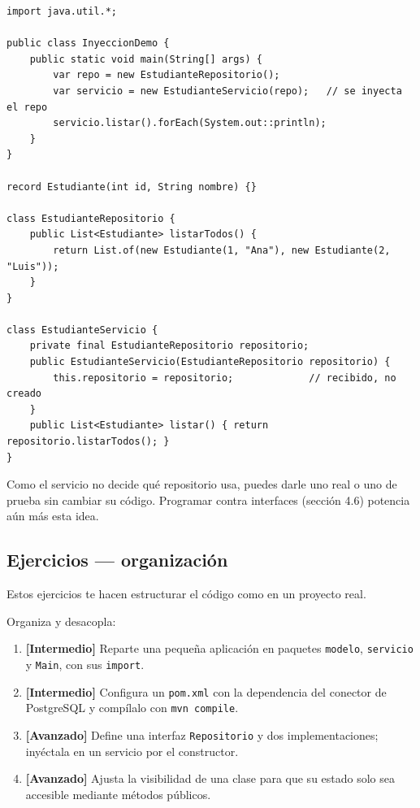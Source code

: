 \documentclass[11pt]{article}
\begin{document}
\begin{cajacodigo}
\begin{lstlisting}[style=java]
import java.util.*;

public class InyeccionDemo {
    public static void main(String[] args) {
        var repo = new EstudianteRepositorio();
        var servicio = new EstudianteServicio(repo);   // se inyecta el repo
        servicio.listar().forEach(System.out::println);
    }
}

record Estudiante(int id, String nombre) {}

class EstudianteRepositorio {
    public List<Estudiante> listarTodos() {
        return List.of(new Estudiante(1, "Ana"), new Estudiante(2, "Luis"));
    }
}

class EstudianteServicio {
    private final EstudianteRepositorio repositorio;
    public EstudianteServicio(EstudianteRepositorio repositorio) {
        this.repositorio = repositorio;             // recibido, no creado
    }
    public List<Estudiante> listar() { return repositorio.listarTodos(); }
}
\end{lstlisting}
\end{cajacodigo}
\vspace{2pt}
Como el servicio no decide qué repositorio usa, puedes darle uno real o uno de prueba sin cambiar su código. Programar contra interfaces (sección 4.6) potencia aún más esta idea.

\subsection{Ejercicios — organización}
Estos ejercicios te hacen estructurar el código como en un proyecto real.

Organiza y desacopla:

\begin{enumerate}[leftmargin=1.7em,itemsep=3pt,topsep=2pt]
\item \textbf{[Intermedio]} Reparte una pequeña aplicación en paquetes \texttt{modelo}, \texttt{servicio} y \texttt{Main}, con sus \texttt{import}.
\item \textbf{[Intermedio]} Configura un \texttt{pom.\allowbreak{}xml} con la dependencia del conector de PostgreSQL y compílalo con \texttt{mvn compile}.
\item \textbf{[Avanzado]} Define una interfaz \texttt{Repositorio} y dos implementaciones; inyéctala en un servicio por el constructor.
\item \textbf{[Avanzado]} Ajusta la visibilidad de una clase para que su estado solo sea accesible mediante métodos públicos.
\end{enumerate}
\end{document}
